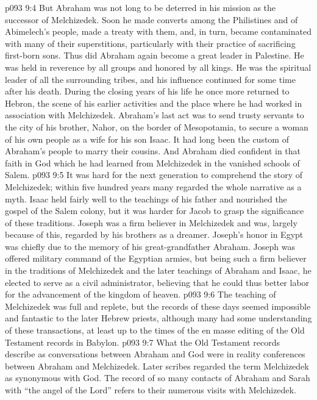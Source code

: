 \vs p093 9:4 But Abraham was not long to be deterred in his mission as the successor of Melchizedek. Soon he made converts among the Philistines and of Abimelech’s people, made a treaty with them, and, in turn, became contaminated with many of their superstitions, particularly with their practice of sacrificing first\hyp{}born sons. Thus did Abraham again become a great leader in Palestine. He was held in reverence by all groups and honored by all kings. He was the spiritual leader of all the surrounding tribes, and his influence continued for some time after his death. During the closing years of his life he once more returned to Hebron, the scene of his earlier activities and the place where he had worked in association with Melchizedek. Abraham’s last act was to send trusty servants to the city of his brother, Nahor, on the border of Mesopotamia, to secure a woman of his own people as a wife for his son Isaac. It had long been the custom of Abraham’s people to marry their cousins. And Abraham died confident in that faith in God which he had learned from Melchizedek in the vanished schools of Salem.
\pc \vs p093 9:5 It was hard for the next generation to comprehend the story of Melchizedek; within five hundred years many regarded the whole narrative as a myth. Isaac held fairly well to the teachings of his father and nourished the gospel of the Salem colony, but it was harder for Jacob to grasp the significance of these traditions. Joseph was a firm believer in Melchizedek and was, largely because of this, regarded by his brothers as a dreamer. Joseph’s honor in Egypt was chiefly due to the memory of his great\hyp{}grandfather Abraham. Joseph was offered military command of the Egyptian armies, but being such a firm believer in the traditions of Melchizedek and the later teachings of Abraham and Isaac, he elected to serve as a civil administrator, believing that he could thus better labor for the advancement of the kingdom of heaven.
\vs p093 9:6 The teaching of Melchizedek was full and replete, but the records of these days seemed impossible and fantastic to the later Hebrew priests, although many had some understanding of these transactions, at least up to the times of the en masse editing of the Old Testament records in Babylon.
\vs p093 9:7 What the Old Testament records describe as conversations between Abraham and God were in reality conferences between Abraham and Melchizedek. Later scribes regarded the term Melchizedek as synonymous with God. The record of so many contacts of Abraham and Sarah with “the angel of the Lord” refers to their numerous visits with Melchizedek.
